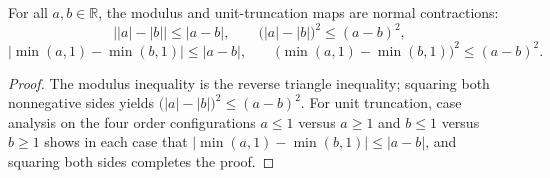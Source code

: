 \begin{lemma}\label{lem:normal_contraction_inequalities}
\leanok
For all $a, b \in \mathbb{R}$, the modulus and unit-truncation maps are normal contractions:
\[
  \bigl\lvert \lvert a \rvert - \lvert b \rvert \bigr\rvert \le \lvert a - b \rvert, \qquad
  \bigl(\lvert a \rvert - \lvert b \rvert\bigr)^2 \le (a - b)^2,
\]
\[
  \bigl\lvert \min(a, 1) - \min(b, 1) \bigr\rvert \le \lvert a - b \rvert, \qquad
  \bigl(\min(a, 1) - \min(b, 1)\bigr)^2 \le (a - b)^2.
\]
\end{lemma}

\begin{proof}
\leanok
The modulus inequality is the reverse triangle inequality; squaring both nonnegative sides yields $\bigl(\lvert a \rvert - \lvert b \rvert\bigr)^2 \le (a - b)^2$. For unit truncation, case analysis on the four order configurations $a \le 1$ versus $a \ge 1$ and $b \le 1$ versus $b \ge 1$ shows in each case that $\bigl\lvert \min(a, 1) - \min(b, 1) \bigr\rvert \le \lvert a - b \rvert$, and squaring both sides completes the proof.
\end{proof}
